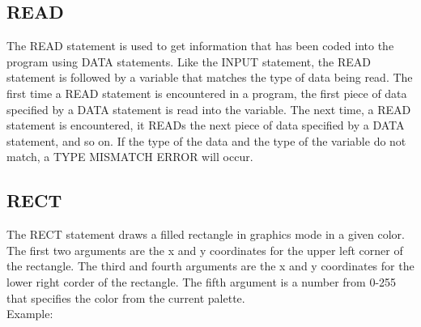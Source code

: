 \subsection{READ}

The {\ttfamily READ} statement is used to get information that has been coded
into the program using {\ttfamily DATA} statements.  Like the {\ttfamily INPUT}
statement, the {\ttfamily READ} statement is followed by a variable that
matches the type of data being read.  The first time a {\ttfamily READ}
statement is encountered in a program, the first piece of data specified by a
{\ttfamily DATA} statement is read into the variable.  The next time, a
{\ttfamily READ} statement is encountered, it {\ttfamily READ}s the next piece
of data specified by a {\ttfamily DATA} statement, and so on.  If the type of
the data and the type of the variable do not match, a {\ttfamily TYPE MISMATCH
ERROR} will occur.\\


\subsection{RECT}

The {\ttfamily RECT} statement draws a filled rectangle in graphics mode in a
given color.  The first two arguments are the x and y coordinates for the upper
left corner of the rectangle.  The third and fourth arguments are the x and y
coordinates for the lower right corder of the rectangle.  The fifth argument is
a number from 0-255 that specifies the color from the current palette.\\

Example:\\



